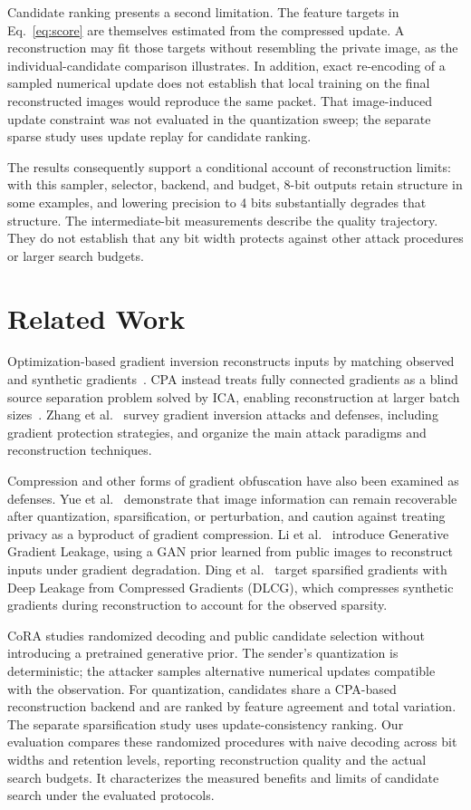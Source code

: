 \documentclass{article}
\newcommand{\cora}{CoRA}
\begin{document}
Candidate ranking presents a second limitation. The feature targets in
Eq.~\ref{eq:score} are themselves estimated from the compressed update.
A reconstruction may fit those targets without resembling the private
image, as the individual-candidate comparison illustrates. In addition,
exact re-encoding of a sampled numerical update does not establish that
local training on the final reconstructed images would reproduce the
same packet. That image-induced update constraint was not evaluated in
the quantization sweep; the separate sparse study uses update replay
for candidate ranking.

The results consequently support a conditional account of reconstruction
limits: with this sampler, selector, backend, and budget, 8-bit outputs
retain structure in some examples, and lowering precision to 4 bits
substantially degrades that structure. The intermediate-bit measurements
describe the quality trajectory. They do not establish that any bit
width protects against other attack procedures or larger search budgets.

\section{Related Work}
\label{sec:related}
Optimization-based gradient inversion reconstructs inputs by matching
observed and synthetic gradients~\cite{zhu2019deep,geiping2020inverting}.
CPA instead treats fully connected gradients as a blind source separation
problem solved by ICA, enabling reconstruction at larger batch
sizes~\cite{kariyappa2023cocktail}. Zhang et al.~\cite{zhang2022survey}
survey gradient inversion attacks and defenses, including gradient
protection strategies, and organize the main attack paradigms and
reconstruction techniques.

Compression and other forms of gradient obfuscation have also been
examined as defenses. Yue et al.~\cite{yue2023gradient} demonstrate that
image information can remain recoverable after quantization,
sparsification, or perturbation, and caution against treating privacy
as a byproduct of gradient compression. Li et al.~\cite{li2022ggl}
introduce Generative Gradient Leakage, using a GAN prior learned from
public images to reconstruct inputs under gradient degradation.
Ding et al.~\cite{ding2024compressed} target sparsified gradients with
Deep Leakage from Compressed Gradients (DLCG), which compresses synthetic
gradients during reconstruction to account for the observed sparsity.

\cora{} studies randomized decoding and public candidate selection
without introducing a pretrained generative prior. The sender's
quantization is deterministic; the attacker samples alternative numerical
updates compatible with the observation. For quantization, candidates
share a CPA-based reconstruction backend and are ranked by feature
agreement and total variation. The separate sparsification study uses
update-consistency ranking. Our evaluation compares these randomized
procedures with naive decoding across bit widths and retention levels,
reporting reconstruction quality and the actual search budgets.
It characterizes the measured benefits and limits of candidate search
under the evaluated protocols.
\end{document}
